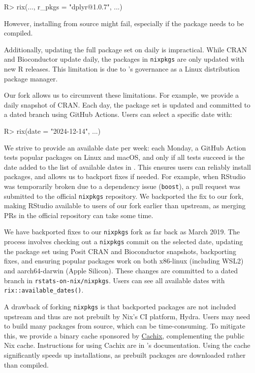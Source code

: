 \documentclass[
  article]{jss}
\begin{document}
\begin{CodeInput}
R> rix(..., r_pkgs = "dplyr@1.0.7", ...)
\end{CodeInput}

However, installing from source might fail, especially if the package
needs to be compiled.

Additionally, updating the full  package set on 
daily is impractical. While CRAN and Bioconductor update daily, the
 packages in \texttt{nixpkgs} are only updated with new R
releases. This limitation is due to 's governance as a Linux
distribution package manager.

Our fork allows us to circumvent these limitations. For example, we
provide a daily snapshot of CRAN. Each day, the  package set
is updated and committed to a dated branch using GitHub Actions. Users
can select a specific date with:

\begin{CodeInput}
R> rix(date = "2024-12-14", ...)
\end{CodeInput}

We strive to provide an available date per week: each Monday, a GitHub
Action tests popular packages on Linux and macOS, and only if all tests
succeed is the date added to the list of available dates in .
This ensures users can reliably install packages, and allows us to
backport fixes if needed. For example, when RStudio was temporarily
broken due to a dependency issue (\texttt{boost}), a pull request was
submitted to the official \texttt{nixpkgs} repository. We backported the
fix to our fork, making RStudio available to users of our fork earlier
than upstream, as merging PRs in the official repository can take some
time.

We have backported fixes to our \texttt{nixpkgs} fork as far back as
March 2019. The process involves checking out a \texttt{nixpkgs} commit
on the selected date, updating the  package set using Posit
CRAN and Bioconductor snapshots, backporting fixes, and ensuring popular
packages work on both x86-linux (including WSL2) and aarch64-darwin
(Apple Silicon). These changes are committed to a dated branch in
\texttt{rstats-on-nix/nixpkgs}. Users can see all available dates with
\texttt{rix::available\_dates()}.

A drawback of forking \texttt{nixpkgs} is that backported packages are
not included upstream and thus are not prebuilt by Nix's CI platform,
Hydra. Users may need to build many packages from source, which can be
time-consuming. To mitigate this, we provide a binary cache sponsored by
\href{https://www.cachix.org/}{Cachix}, complementing the public Nix
cache. Instructions for using Cachix are in 's documentation.
Using the cache significantly speeds up installations, as prebuilt
packages are downloaded rather than compiled.
\end{document}
